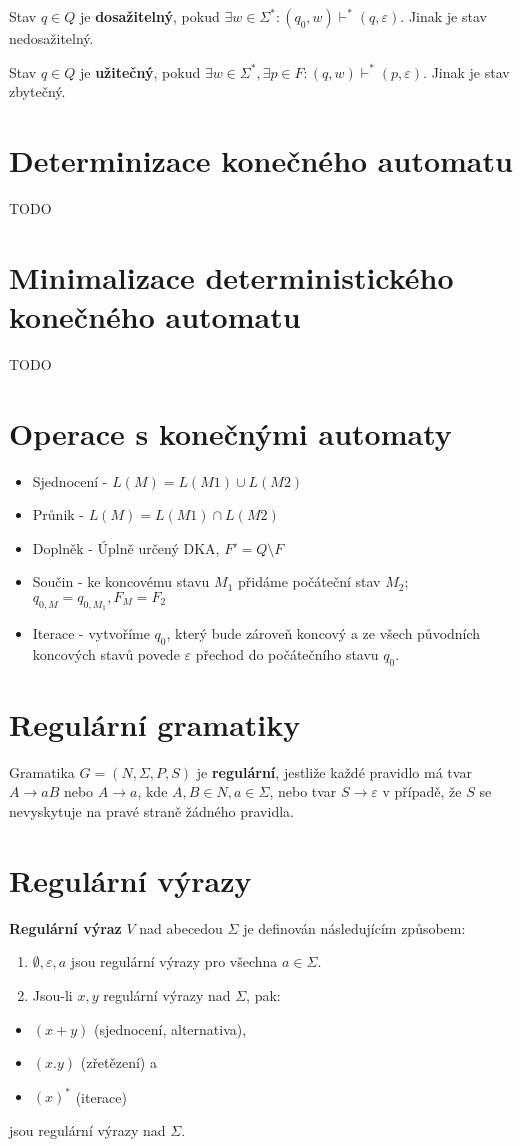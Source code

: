 \documentclass{szzclass}
\begin{document}
Stav $q\in Q$ je \textbf{dosažitelný}, pokud $\exists w\in\Sigma^{*}: (q_0,w)\vdash^{*}(q,\varepsilon)$. Jinak je stav nedosažitelný.

Stav $q\in Q$ je \textbf{užitečný}, pokud $\exists w\in\Sigma^{*},\exists p\in F: (q,w)\vdash^{*}(p,\varepsilon)$. Jinak je stav zbytečný.

\section{Determinizace konečného automatu}
TODO
\section{Minimalizace deterministického konečného automatu}
TODO

\section{Operace s konečnými automaty}
\begin{itemize}
\item Sjednocení - $L(M) = L(M1) \cup L(M2)$
\item Průnik - $L(M) = L(M1) \cap L(M2)$
\item Doplněk - Úplně určený DKA, $F'=Q\setminus F$
\item Součin - ke koncovému stavu $M_1$ přidáme počáteční stav $M_2$; $q_{0,M}=q_{0,M_1}, F_M=F_2$
\item Iterace - vytvoříme $q_0$, který bude zároveň koncový a ze všech původních koncových stavů povede $\varepsilon$ přechod do počátečního stavu $q_0$.
\end{itemize}

\section{Regulární gramatiky}
Gramatika $G=(N,\Sigma,P,S)$ je \textbf{regulární}, jestliže každé pravidlo má tvar $A \to aB$ nebo $A \to a$, kde $A, B \in N, a \in \Sigma$, nebo tvar $S \to \varepsilon$ v případě, že $S$ se nevyskytuje na pravé straně žádného pravidla.

\section{Regulární výrazy}
\begin{definition}
\textbf{Regulární výraz} $V$ nad abecedou $\Sigma$ je definován následujícím způsobem:
\begin{enumerate}
\item $\emptyset, \varepsilon, a$ jsou regulární výrazy pro všechna $a \in\Sigma$.
\item Jsou-li $x, y$ regulární výrazy nad $\Sigma$, pak:
\end{enumerate}
\begin{itemize}
\item $(x + y)$ (sjednocení, alternativa),
\item $(x.y)$ (zřetězení) a
\item $(x)^*$ (iterace)
\end{itemize}
jsou regulární výrazy nad $\Sigma$.
\end{definition}
\end{document}
